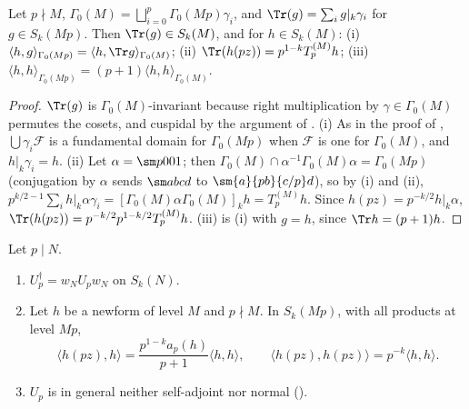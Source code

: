\begin{lemma}\label{lem:hecke:trace}
Let $p\nmid M$, $\Gamma_0(M)=\bigsqcup_{i=0}^{p}\Gamma_0(Mp)\gamma_i$, and $\Tr(g)=\sum_ig|_k\gamma_i$ for $g\in S_k(Mp)$. Then $\Tr(g)\in S_k(M)$, and for $h\in S_k(M)$:
(i) $\langle h,g\rangle_{\Gamma_0(Mp)}=\langle h,\Tr g\rangle_{\Gamma_0(M)}$; (ii) $\Tr(h(pz))=p^{1-k}T_p^{(M)}h$; (iii) $\langle h,h\rangle_{\Gamma_0(Mp)}=(p+1)\langle h,h\rangle_{\Gamma_0(M)}$.
\end{lemma}

\begin{proof}
$\Tr(g)$ is $\Gamma_0(M)$-invariant because right multiplication by $\gamma\in\Gamma_0(M)$ permutes the cosets, and cuspidal by the argument of . (i) As
in the proof of , $\bigcup\gamma_i\mathcal F$ is a fundamental domain for $\Gamma_0(Mp)$ when $\mathcal F$ is one for $\Gamma_0(M)$, and $h|_k\gamma_i=h$. (ii) Let
$\alpha=\sm p001$; then $\Gamma_0(M)\cap\alpha^{-1}\Gamma_0(M)\alpha=\Gamma_0(Mp)$ (conjugation by $\alpha$ sends $\sm abcd$ to $\sm{a}{pb}{c/p}d$), so by (i) and
(ii), $p^{k/2-1}\sum_ih|_k\alpha\gamma_i=[\Gamma_0(M)\alpha\Gamma_0(M)]_kh=T_p^{(M)}h$. Since $h(pz)=p^{-k/2}h|_k\alpha$, $\Tr(h(pz))=p^{-k/2}p^{1-k/2}T_p^{(M)}h$. (iii) is (i)
with $g=h$, since $\Tr h=(p+1)h$.
\end{proof}

\begin{proposition}\label{prop:hecke:Up-adjoint}
Let $p\mid N$.
\begin{enumerate}[label=(\roman*)]
\item $U_p^\dagger=w_NU_pw_N$ on $S_k(N)$.
\item Let $h$ be a newform of level $M$ and $p\nmid M$. In $S_k(Mp)$, with all products at level $Mp$,
\[
\langle h(pz),h\rangle=\frac{p^{1-k}a_p(h)}{p+1}\langle h,h\rangle,\qquad\langle h(pz),h(pz)\rangle=p^{-k}\langle h,h\rangle.
\]
\item $U_p$ is in general neither self-adjoint nor normal ().
\end{enumerate}
\end{proposition}

